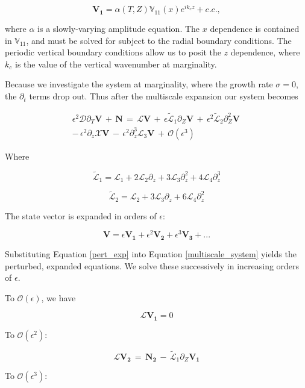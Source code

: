 \documentclass{emulateapj}
\newcommand{\beq}{\begin{equation}}
\newcommand{\eeq}{\end{equation}}
\begin{document}
\beq
\label{V1_ansatz}
\mathbf{V_1} = \alpha(T, Z) \mathbb{V}_{11}(x) e^{i k_c z} + c.c.,
\eeq

where $\alpha$ is a slowly-varying amplitude equation. The $x$ dependence is contained in $\mathbb{V}_{11}$, and must be solved for subject to the radial boundary conditions. The periodic vertical boundary conditions allow us to posit the $z$ dependence, where $k_c$ is the value of the vertical wavenumber at marginality. 

Because we investigate the system at marginality, where the growth rate $\sigma = 0$, the $\partial_t$ terms drop out. Thus after the multiscale expansion our system becomes

\begin{multline}
\label{multiscale_system}
\epsilon^2 \mathcal{D}\partial_T\mathbf{V} \, + \, \mathbf{N} \, = \, \mathcal{L}\mathbf{V} \, + \, \epsilon\widetilde{\mathcal{L}}_1\partial_Z\mathbf{V} \, + \, \epsilon^2\widetilde{\mathcal{L}}_2\partial_Z^2\mathbf{V} \, \\
 - \, \epsilon^2\partial_z\mathcal{X}\mathbf{V} \, - \, \epsilon^2\partial_z^3\mathcal{L}_3\mathbf{V} \, + \, \mathcal{O}(\epsilon^3)
\end{multline}

Where

\beq
\widetilde{\mathcal{L}}_1 = \mathcal{L}_1 + 2\mathcal{L}_2\partial_z + 3\mathcal{L}_3\partial_z^2 + 4\mathcal{L}_4\partial_z^3
\eeq

\beq
\widetilde{\mathcal{L}}_2 = \mathcal{L}_2 + 3\mathcal{L}_3\partial_z + 6\mathcal{L}_4\partial_z^2
\eeq


The state vector is expanded in orders of $\epsilon$:

\beq
\label{pert_exp}
\mathbf{V} = \epsilon\mathbf{V_1} + \epsilon^2\mathbf{V_2} + \epsilon^3\mathbf{V_3} + ...
\eeq

Substituting Equation \ref{pert_exp} into Equation \ref{multiscale_system} yields the perturbed, expanded equations. We solve these successively in increasing orders of $\epsilon$.

To $\mathcal{O}(\epsilon)$, we have

\beq
\label{ordere}
\mathcal{L}\mathbf{V_1} = 0
\eeq

To $\mathcal{O}(\epsilon^2)$: 

\beq
\label{ordere2}
\mathcal{L}\mathbf{V_2} \, = \, \mathbf{N_2} \, - \, \widetilde{\mathcal{L}}_1 \partial_Z \mathbf{V_1}
\eeq

To $\mathcal{O}(\epsilon^3)$: 
\end{document}
